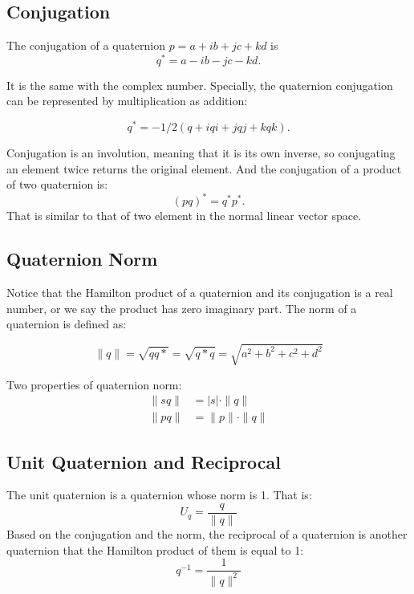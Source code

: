 \documentclass{article}
\begin{document}
\subsection{Conjugation}

The conjugation of a quaternion $p=a+ib+jc+kd$ is 
\begin{displaymath}
  q^*=a-ib-jc-kd. 
\end{displaymath}

It is the same with the complex number. Specially, the quaternion conjugation can be represented by multiplication as addition:

\begin{displaymath}
  q^* = -1/2(q+iqi+jqj+kqk).
\end{displaymath}

Conjugation is an involution, meaning that it is its own inverse, so conjugating an element twice returns the original element. And the conjugation of a product of two quaternion is:
\begin{displaymath}
  (pq)^* = q^*p^*.
\end{displaymath}
That is similar to that of two element in the normal linear vector space.

\subsection{Quaternion Norm}

Notice that the Hamilton product of a quaternion and its conjugation is a real number, or we say the product has zero imaginary part. The norm of a quaternion is defined as:

\begin{equation}
  \|q\| = \sqrt{qq*} = \sqrt{q*q} = \sqrt{a^2+b^2+c^2+d^2}
\end{equation}

Two properties of quaternion norm:
\begin{equation}
  \begin{split}
    \|sq\| &= |s| \cdot \|q\|   \\
    \|pq\| &= \|p\| \cdot \|q\|
  \end{split}
\end{equation}

\subsection{Unit Quaternion and Reciprocal}
The unit quaternion is a quaternion whose norm is 1. That is:
\begin{equation}
  U_q = \frac{q}{\|q\|}
\end{equation}
Based on the conjugation and the norm, the reciprocal of a quaternion is another quaternion that the Hamilton product of them is equal to 1:
\begin{equation}
  q^{-1} = \frac{1}{\|q\|^2}
\end{equation}
\end{document}
